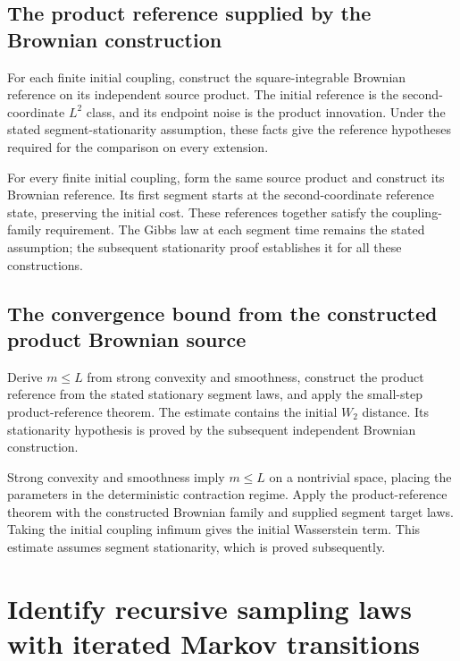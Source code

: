 \documentclass[11pt,a4paper]{report}
\begin{document}
\subsection{\texorpdfstring{The product reference supplied by the Brownian construction}{The product reference supplied by the Brownian construction}}
\label{report-step-UnadjustedLangevin-ProductBrownian-lean-21}


For each finite initial coupling, construct the square-integrable Brownian reference on its independent source product. The initial reference is the second-coordinate \(L^2\) class, and its endpoint noise is the product innovation. Under the stated segment-stationarity assumption, these facts give the reference hypotheses required for the comparison on every extension.



For every finite initial coupling, form the same source product and construct its Brownian reference. Its first segment starts at the second-coordinate reference state, preserving the initial cost. These references together satisfy the coupling-family requirement. The Gibbs law at each segment time remains the stated assumption; the subsequent stationarity proof establishes it for all these constructions.

\subsection{\texorpdfstring{The convergence bound from the constructed product Brownian source}{The convergence bound from the constructed product Brownian source}}
\label{report-step-UnadjustedLangevin-ProductBrownian-lean-22}


Derive \(m\le L\) from strong convexity and smoothness, construct the product reference from the stated stationary segment laws, and apply the small-step product-reference theorem. The estimate contains the initial \(W_2\) distance. Its stationarity hypothesis is proved by the subsequent independent Brownian construction.



Strong convexity and smoothness imply \(m\le L\) on a nontrivial space, placing the parameters in the deterministic contraction regime. Apply the product-reference theorem with the constructed Brownian family and supplied segment target laws. Taking the initial coupling infimum gives the initial Wasserstein term. This estimate assumes segment stationarity, which is proved subsequently.

\section{\texorpdfstring{Identify recursive sampling laws with iterated Markov transitions}{Identify recursive sampling laws with iterated Markov transitions}}
\label{proof-module-UnadjustedLangevin-MarkovLaw-lean}
\end{document}
